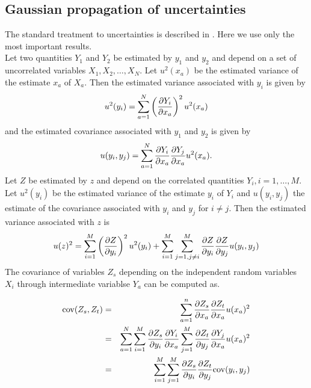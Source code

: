 \subsection{Gaussian propagation of uncertainties} \label{gum}
The standard treatment to uncertainties is described in \cite{GUM}. Here we use only the most important results. \\
Let two quantities $Y_1$ and $Y_2$ be estimated by $y_1$ and $y_2$ and depend on a set of uncorrelated variables $X_1, X_2, \ldots, X_N$. 
Let $u^2(x_a)$ be the estimated variance of the estimate $x_a$ of $X_a$. 
Then the estimated variance associated with $y_i$ is given by
\begin{equation}
 u^2(y_i) = \sum_{a=1}^N \left( \frac{\partial  Y_i}{\partial  x_a}\right)^2 u^2(x_a) \label{eq:gum_uy}
\end{equation}
and the estimated covariance associated with $y_1$ and $y_2$ is given by
\begin{equation}
 u(y_i, y_j) = \sum_{a=1}^N \frac{\partial  Y_i}{\partial  x_a} \frac{\partial  Y_j}{\partial  x_a} u^2(x_a). \label{eq:gum_covy}
\end{equation}
Let $Z$  be estimated by $z$ and depend on the correlated quantities $Y_i, i=1, \dots, M $. Let $u^2(y_i)$ be the estimated variance of the estimate $y_i$ of $Y_i$ and $u(y_i, y_j)$ the estimate of the covariance associated with $y_i$ and $y_j$ for $i \neq j$.
Then the estimated variance associated with $z$ is 
\begin{equation}
u(z)^2 = \sum_{i=1}^M  \left( \frac{\partial  Z}{\partial  y_i}\right)^2 u^2(y_i) + \sum_{i=1}^M \sum_{j=1, j\neq i}^M \frac{\partial Z}{\partial y_i} \frac{\partial Z}{\partial y_j} u (y_i, y_j)
\end{equation}
The covariance of variables $Z_s$ depending on the independent random variables $X_i$ through intermediate variablse $Y_a$ can be computed as.

\begin{eqnarray}
\mathrm{cov}(Z_s, Z_t)& =&
\sum_{a=1}^n \frac{\partial Z_s}{\partial x_a} \frac{\partial Z_t}{\partial x_a} u(x_a)^2 \\
&=& \sum_{a=1}^N \sum_{i=1}^M \frac{\partial Z_s}{\partial y_i} \frac{\partial Y_i}{\partial x_a}
  \sum_{j=1}^M\frac{\partial Z_t}{\partial y_j} \frac{\partial Y_j}{\partial x_a} u(x_a)^2 \\
  &=& \sum_{i=1}^M \sum_{j=1}^M \frac{\partial Z_s}{\partial y_i} \frac{\partial Z_t}{\partial y_j} \mathrm{cov}(y_i, y_j)
\end{eqnarray}


